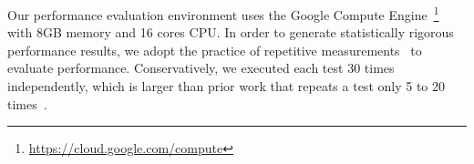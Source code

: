 
Our performance evaluation environment uses the Google Compute Engine~\footnote{\url{https://cloud.google.com/compute}} with 8GB memory and 16 cores CPU. In order to generate statistically rigorous performance results, we adopt the practice of repetitive measurements~\cite{peterfse} to evaluate performance. Conservatively, we executed each test 30 times independently, which is larger than prior work that  %
repeats a test only 5 to 20 times~\cite{Laaber2018MSR, Leitner2016TIT,DBLP:journals/ese/LaaberSL19}. 

